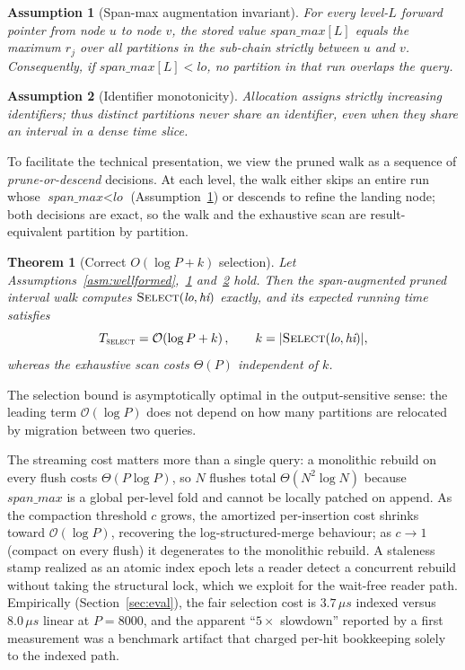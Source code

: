 \documentclass{article}
\newtheorem{theorem}{Theorem}
\newtheorem{assumption}{Assumption}
\begin{document}
\begin{assumption}[Span-max augmentation invariant]
\label{asm:spanmax}
For every level-$L$ forward pointer from node $u$ to node $v$, the stored value
$\textit{span\_max}[L]$ equals the maximum $r_j$ over all partitions in the sub-chain
strictly between $u$ and $v$. Consequently, if $\textit{span\_max}[L] < \textit{lo}$, no
partition in that run overlaps the query.
\end{assumption}

\begin{assumption}[Identifier monotonicity]
\label{asm:id}
Allocation assigns strictly increasing identifiers; thus distinct partitions never share
an identifier, even when they share an interval in a dense time slice.
\end{assumption}

To facilitate the technical presentation, we view the pruned walk as a sequence of
\emph{prune-or-descend} decisions. At each level, the walk either skips an entire run
whose $\textit{span\_max} < \textit{lo}$ (Assumption~\ref{asm:spanmax}) or descends to
refine the landing node; both decisions are exact, so the walk and the exhaustive scan
are result-equivalent partition by partition.

\begin{theorem}[Correct $O(\log P + k)$ selection]
\label{thm:select}
Let Assumptions~\ref{asm:wellformed},~\ref{asm:spanmax} and~\ref{asm:id} hold. Then the
span-augmented pruned interval walk computes
$\textsc{Select}(\textit{lo}, \textit{hi})$ exactly, and its expected running time
satisfies
\begin{equation}
T_{\textsc{select}} = \mathcal{O}\!\left(\log P + k\right), \qquad k = |\textsc{Select}(\textit{lo}, \textit{hi})|,
\end{equation}
whereas the exhaustive scan costs $\Theta(P)$ independent of $k$.
\end{theorem}

The selection bound is asymptotically optimal in the output-sensitive sense: the leading
term $\mathcal{O}(\log P)$ does not depend on how many partitions are relocated by
migration between two queries.

The streaming cost matters more than a single query: a monolithic rebuild on every flush
costs $\Theta(P \log P)$, so $N$ flushes total $\Theta(N^2 \log N)$ because
$\textit{span\_max}$ is a global per-level fold and cannot be locally patched on append.
As the compaction threshold $c$ grows, the amortized per-insertion cost shrinks toward
$\mathcal{O}(\log P)$, recovering the log-structured-merge behaviour; as $c \to 1$
(compact on every flush) it degenerates to the monolithic rebuild. A staleness stamp
realized as an atomic index epoch lets a reader detect a concurrent rebuild without
taking the structural lock, which we exploit for the wait-free reader path. Empirically
(Section~\ref{sec:eval}), the fair selection cost is $3.7\,\mu s$ indexed versus
$8.0\,\mu s$ linear at $P = 8000$, and the apparent ``$5\times$ slowdown'' reported by a
first measurement was a benchmark artifact that charged per-hit bookkeeping solely to the
indexed path.
\end{document}
